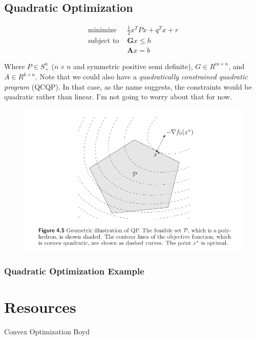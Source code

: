 \documentclass{article}
\begin{document}
\subsection{Quadratic Optimization}

\begin{align}
    \text{minimize }   & \frac{1}{2} x^T P x + q^T x + r \\
    \text{subject to } & \boldsymbol{G} x \le h          \\
                       & \boldsymbol{A} x = b
\end{align}

\noindent
Where $P \in S^{n}_{+}$ ($n \times n$ and symmetric positive semi definite), $G \in R^{m \times n}$, and $A \in R^{k \times n}$.
Note that we could also have a {\em quadratically constrained quadratic program\/} (QCQP). In that case, as the name suggests, the constraints would be quadratic rather than linear. I'm not going to worry about that for now.

\begin{figure}[h!]
    \centering
    \includegraphics[width=1\textwidth]{./figures/QuadraticOptimizationIllustration.png}
\end{figure}

\subsubsection{Quadratic Optimization Example}


\section{Resources}

Convex Optimization Boyd




\end{document}
